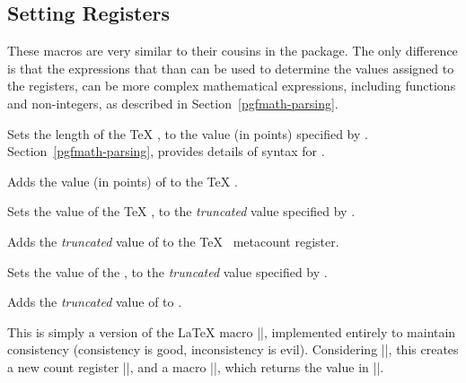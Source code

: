 \subsection{Setting Registers}

\label{pgfmath-registers}

These macros are very similar to their cousins in the \calcname{} 
package. The only difference is that the expressions that than can be
used to determine the values assigned to the registers, can be more
complex mathematical expressions, including functions and 
non-integers, as described in Section~\ref{pgfmath-parsing}. 

\begin{command}{\pgfmathsetlength{}}
Sets the length of the \TeX{} , to the value
(in points) specified by . 
Section~\ref{pgfmath-parsing}, provides details of syntax for
.
\end{command}

\begin{command}{\pgfmathaddtolength{}}
	Adds the value (in points) of  to the \TeX{} 
	.
\end{command}

\begin{command}{\pgfmathsetcount{}}
	Sets the value of the \TeX{} , to the 
	\emph{truncated} value specified by . 
\end{command}

\begin{command}{\pgfmathaddtocount{}}
	Adds the \emph{truncated} value  of  to the \TeX{} 
\	meta{count register}.
\end{command}

\begin{command}{\pgfmathsetcounter{}}
	Sets the value of the , to the \emph{truncated} value 
	specified by . 
\end{command}

\begin{command}{\pgfmathaddtocounter{}}
	Adds the \emph{truncated} value  of  to 
	.
\end{command}

\begin{command}{\pgfmathnewcounter{}}
	This is simply a version of the \LaTeX{} macro |\newcounter|, 
	implemented	entirely to maintain consistency (consistency is good,
	inconsistency is evil). Considering ||, this
	creates a new count register |\c@foo|, and a macro |\thefoo|, which
	returns the value in |\c@foo|.
\end{command}

